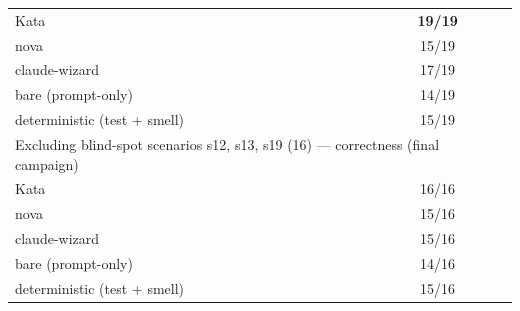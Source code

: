 \documentclass[11pt]{article}
\begin{document}
\begin{table}[!ht]
\begin{tabular}{@{}lcccc@{}}
Kata & & & \textbf{19/19} & \\
nova & & & 15/19 & \\
claude-wizard & & & 17/19 & \\
bare (prompt-only) & & & 14/19 & \\
deterministic (test + smell) & & & 15/19 & \\
\midrule
\multicolumn{5}{l}{Excluding blind-spot scenarios s12, s13, s19 (16) --- correctness (final campaign)} \\
Kata & & & 16/16 & \\
nova & & & 15/16 & \\
claude-wizard & & & 15/16 & \\
bare (prompt-only) & & & 14/16 & \\
deterministic (test + smell) & & & 15/16 & \\
\bottomrule
\end{tabular}
\label{tab:gate-comparison}
\end{table}
\end{document}
